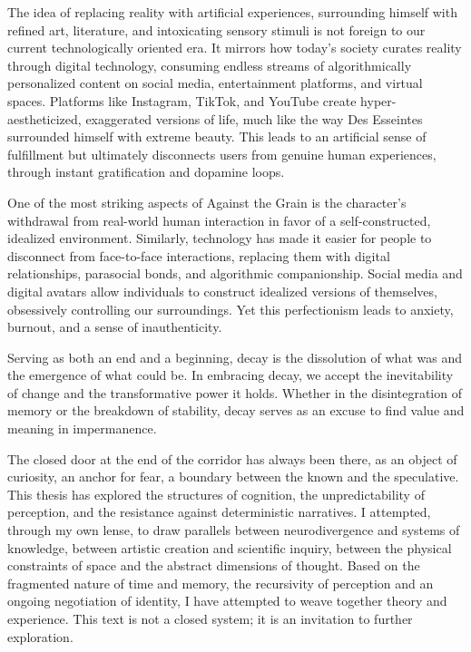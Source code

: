 The idea of replacing reality with artificial experiences, surrounding himself with refined art, literature, and intoxicating sensory stimuli is not foreign to our current technologically oriented era. It mirrors how today's society curates reality through digital technology, consuming endless streams of algorithmically personalized content on social media, entertainment platforms, and virtual spaces. Platforms like Instagram, TikTok, and YouTube create hyper-aestheticized, exaggerated versions of life, much like the way Des Esseintes surrounded himself with extreme beauty. This leads to an artificial sense of fulfillment but ultimately disconnects users from genuine human experiences, through instant gratification and dopamine loops.

One of the most striking aspects of Against the Grain is the character's withdrawal from real-world human interaction in favor of a self-constructed, idealized environment. Similarly, technology has made it easier for people to disconnect from face-to-face interactions, replacing them with digital relationships, parasocial bonds, and algorithmic companionship. Social media and digital avatars allow individuals to construct idealized versions of themselves, obsessively controlling our surroundings. Yet this perfectionism leads to anxiety, burnout, and a sense of inauthenticity.

Serving as both an end and a beginning, decay is the dissolution of what was and the emergence of what could be. In embracing decay, we accept the inevitability of change and the transformative power it holds. Whether in the disintegration of memory or the breakdown of stability, decay serves as an excuse to find value and meaning in impermanence.



The closed door at the end of the corridor has always been there, as an object of curiosity, an anchor for fear, a boundary between the known and the speculative. This thesis has explored the structures of cognition, the unpredictability of perception, and the resistance against deterministic narratives. I attempted, through my own lense, to draw parallels between neurodivergence and systems of knowledge, between artistic creation and scientific inquiry, between the physical constraints of space and the abstract dimensions of thought. Based on the fragmented nature of time and memory, the recursivity of perception and an ongoing negotiation of identity, I have attempted to weave together theory and experience. This text is not a closed system; it is an invitation to further exploration. 